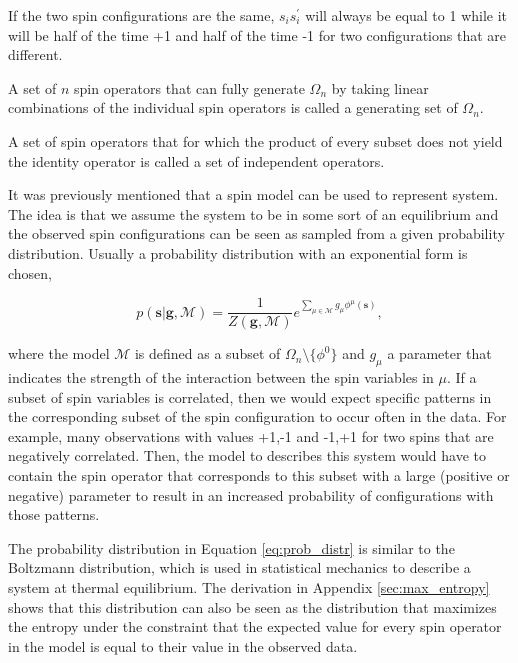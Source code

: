 \noindent
If the two spin configurations are the same, $s_i s_i^\prime$ will always be equal to 1 while it will be half of the time +1 and half of the time -1 for two configurations that are different.

\begin{definition}
    A set of $n$ spin operators that can fully generate $\Omega_n$ by taking linear combinations of the individual spin operators is called a generating set of $\Omega_n$.
\end{definition}

\begin{definition}
    A set of spin operators that for which the product of every subset does not yield the identity operator is called a set of independent operators.
\end{definition}

\noindent
It was previously mentioned that a spin model can be used to represent system. The idea is that we assume the system to be in some sort of an equilibrium and the observed spin configurations can be seen as sampled from a given probability distribution.
Usually a probability distribution with an exponential form is chosen,

\begin{equation}\label{eq:prob_distr}
    p(\mathbf{s}| \mathbf{g}, \mathcal{M}) = \frac{1}{Z(\mathbf{g}, \mathcal{M})} e^{\sum_{\mu \in \mathcal{M}} g_\mu \phi^\mu(\mathbf{s})},
\end{equation}

\noindent
where the model $\mathcal{M}$ is defined as a subset of $\Omega_n \setminus \{ \phi^0 \}$ and $g_\mu$ a parameter that indicates the strength of the interaction between the spin variables in $\mu$.
If a subset of spin variables is correlated, then we would expect specific patterns in the corresponding subset of the spin configuration to occur often in the data.
For example, many observations with values +1,-1 and -1,+1 for two spins that are negatively correlated. 
Then, the model to describes this system would have to contain the spin operator that corresponds to this subset with a large (positive or negative) parameter to result in an increased probability of configurations with those patterns.

\noindent
The probability distribution in Equation \ref{eq:prob_distr} is similar to the Boltzmann distribution, which is used in statistical mechanics to describe a system at thermal equilibrium.
The derivation in Appendix \ref{sec:max_entropy} shows that this distribution can also be seen as the distribution that maximizes the entropy under the constraint that the expected value for every spin operator in the model is equal to their value in the observed data.

